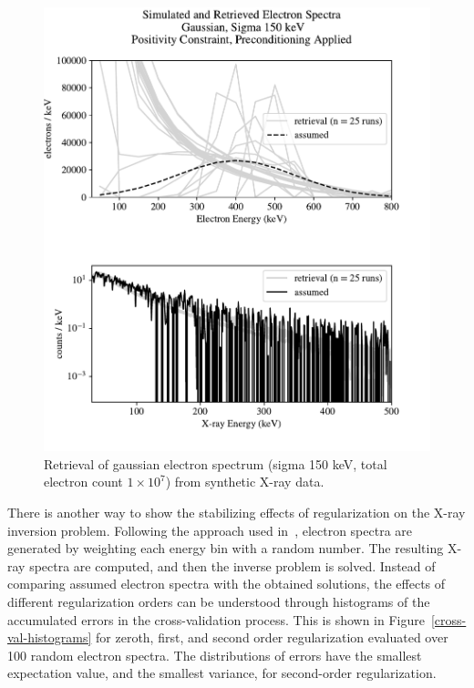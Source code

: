 \begin{figure}[p]
    \centering
    \includegraphics[width=\textwidth]{figures/chapter_4/synthetic_data_examples/gauss_150keV_posonly_preconditioning_1e7_particles}
    \caption{Retrieval of gaussian electron spectrum (sigma 150 keV, total electron count $1\times10^7$) from synthetic X-ray data.}
    \label{why_non_negative_is_good}
\end{figure}

There is another way to show the stabilizing effects of regularization on the X-ray inversion problem. Following the approach used in~\cite{Xu2019}, electron spectra are generated by weighting each energy bin with a random number. The resulting X-ray spectra are computed, and then the inverse problem is solved. Instead of comparing assumed electron spectra with the obtained solutions, the effects of different regularization orders can be understood through histograms of the accumulated errors in the cross-validation process. This is shown in Figure~\ref{cross-val-histograms} for zeroth, first, and second order regularization evaluated over 100 random electron spectra. The distributions of errors have the smallest expectation value, and the smallest variance, for second-order regularization. 

